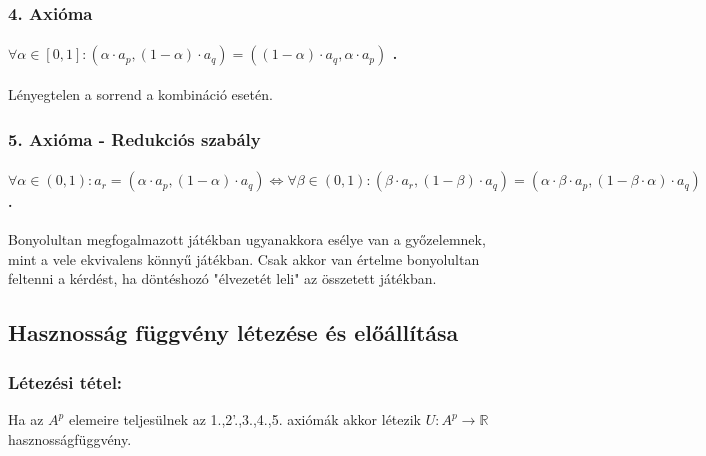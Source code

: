 \documentclass[a4paper,12pt]{article}
\begin{document}
\subsubsection{4. Axióma}
\paragraph{$\forall  \alpha \in [0,1]: (\alpha\cdot a_p , (1-\alpha)\cdot a_q ) = ((1-\alpha)\cdot a_q ,\alpha\cdot a_p )$ . } Lényegtelen a sorrend a kombináció esetén.

\subsubsection{5. Axióma - Redukciós szabály}
\paragraph{$\forall  \alpha \in (0,1): a_r = (\alpha\cdot a_p , (1-\alpha)\cdot a_q) \Leftrightarrow \forall  \beta \in (0,1): (\beta\cdot a_r, (1-\beta)\cdot a_q ) = (\alpha\cdot \beta\cdot a_p , (1-\beta\cdot \alpha)\cdot a_q )$.} Bonyolultan megfogalmazott játékban ugyanakkora esélye van a győzelemnek, mint a vele ekvivalens könnyű játékban. Csak akkor van értelme bonyolultan feltenni a kérdést, ha döntéshozó "élvezetét leli" az összetett játékban.


\subsection{Hasznosság függvény létezése és előállítása}

\subsubsection{Létezési tétel: } Ha az $A^p$ elemeire teljesülnek az 1.,2'.,3.,4.,5. axiómák akkor létezik  $U: A^p \rightarrow \mathbb{R}$ hasznosságfüggvény.
\end{document}
